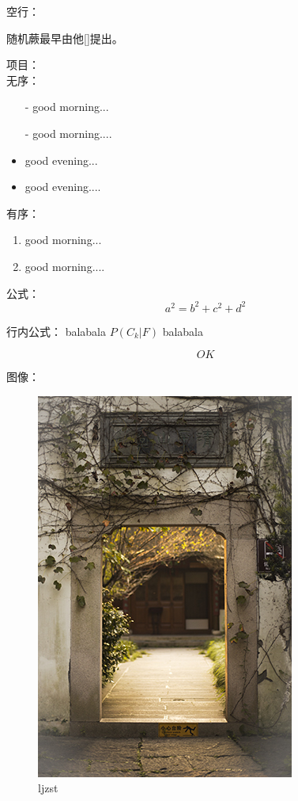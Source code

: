 空行：
\newline

随机蕨最早由他[]提出\cite{ozuysal2007fast}。

项目：\\
无序：
\begin{itemize}
\item[-] good morning...
\item[-] good morning....
\end{itemize}

\begin{itemize}
\item good evening...
\item good evening....
\end{itemize}

有序：
\begin{enumerate}
\item good morning...
\item good morning....
\end{enumerate}

公式：
\begin{equation}
	a^2=b^2+c^2+d^2
\end{equation}

行内公式：
balabala
$P(C_k|F)$
balabala


\begin{equation}
	OK
\end{equation}

图像：
\begin{figure}[htb]
	\centering 
	\includegraphics[scale=1.0]{./Pictures/test.jpg} 
	\caption{ljzst} 
\end{figure}

